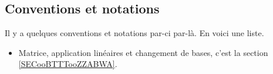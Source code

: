 \immediate\closeout\themetoc

\subsection*{Conventions et notations}

Il y a quelques conventions et notations par-ci par-là. En voici une liste.
\begin{itemize}
    \item Matrice, application linéaires et changement de bases, c'est la section \ref{SECooBTTTooZZABWA}.
\end{itemize}
